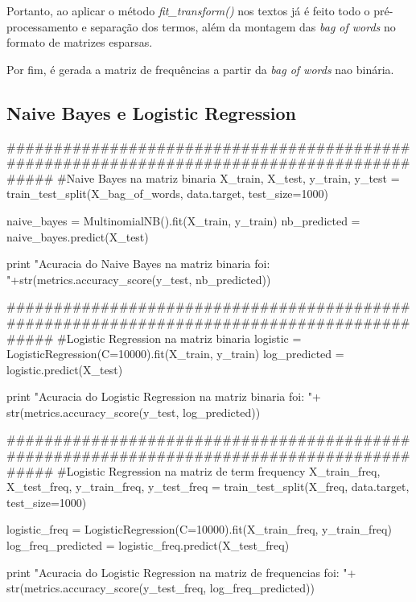 \documentclass{article}
\begin{document}
Portanto, ao aplicar o método \textit{fit\_transform()} nos textos já é feito todo o pré-processamento e separação dos termos, além da montagem das \textit{bag of words} no formato de matrizes esparsas. \par
Por fim, é gerada a matriz de frequências a partir da \textit{bag of words} nao binária.

\newpage

\subsection{Naive Bayes e Logistic Regression}
\begin{tcolorbox}
\begin{python}
###########################################################################################
#Naive Bayes na matriz binaria
X_train, X_test, y_train, y_test = train_test_split(X_bag_of_words, data.target, test_size=1000)

naive_bayes = MultinomialNB().fit(X_train, y_train)
nb_predicted = naive_bayes.predict(X_test)

print "Acuracia do Naive Bayes na matriz binaria foi: "+str(metrics.accuracy_score(y_test, nb_predicted))

###########################################################################################
#Logistic Regression na matriz binaria
logistic = LogisticRegression(C=10000).fit(X_train, y_train)
log_predicted = logistic.predict(X_test)

print "Acuracia do Logistic Regression na matriz binaria foi: "+
   str(metrics.accuracy_score(y_test, log_predicted))

###########################################################################################
#Logistic Regression na matriz de term frequency
X_train_freq, X_test_freq, y_train_freq, y_test_freq = train_test_split(X_freq, data.target, test_size=1000)

logistic_freq = LogisticRegression(C=10000).fit(X_train_freq, y_train_freq)
log_freq_predicted = logistic_freq.predict(X_test_freq)

print "Acuracia do Logistic Regression na matriz de frequencias foi: "+
   str(metrics.accuracy_score(y_test_freq, log_freq_predicted))

\end{python}
\end{tcolorbox}

\newpage
\end{document}
